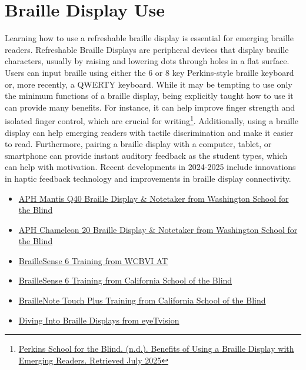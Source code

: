\hypertarget{appx10}{}\section[Braille Display Use]{Braille Display Use}\label{appx10}
Learning how to use a refreshable braille display is essential for emerging braille readers. Refreshable Braille Displays are peripheral devices that display braille characters, usually by raising and lowering dots through holes in a flat surface. Users can input braille using either the 6 or 8 key Perkins-style braille keyboard or, more recently, a QWERTY keyboard. While it may be tempting to use only the minimum functions of a braille display, being explicitly taught how to use it can provide many benefits. For instance, it can help improve finger strength and isolated finger control, which are crucial for writing\footnote{\raggedright \href{https://www.perkins.org/resource/benefits-using-braille-display-emerging-readers/}{Perkins School for the Blind. (n.d.). Benefits of Using a Braille Display with Emerging Readers. Retrieved July 2025}}. Additionally, using a braille display can help emerging readers with tactile discrimination and make it easier to read. Furthermore, pairing a braille display with a computer, tablet, or smartphone can provide instant auditory feedback as the student types, which can help with motivation. Recent developments in 2024-2025 include innovations in haptic feedback technology and improvements in braille display connectivity.
\begin{itemize}
\item \href{https://view.officeapps.live.com/op/view.aspx?src=https\%3A\%2F\%2Fwww.wssb.wa.gov\%2Fsites\%2Fdefault\%2Ffiles\%2F2021-10\%2FUsing\%2520APH\%2520Mantis\%2520Q40.docx&wdOrigin=BROWSELINK}{APH Mantis Q40 Braille Display \& Notetaker from Washington School for the Blind}
\item \href{https://view.officeapps.live.com/op/view.aspx?src=https\%3A\%2F\%2Fwww.wssb.wa.gov\%2Fsites\%2Fdefault\%2Ffiles\%2F2023-07\%2FUsing\%2520APH\%2520Chameleon\%252020.docx&wdOrigin=BROWSELINK}{APH Chameleon 20 Braille Display \& Notetaker from Washington School for the Blind}
\item \href{https://drive.google.com/drive/folders/1V\_hXjrsDeKUbNImA6Q77joADQbqMKKKl}{BrailleSense 6 Training from WCBVI AT}
\item \href{https://drive.google.com/drive/folders/10HeixUb4E21nPLCStmnrsxLVehKThPP}{BrailleSense 6 Training from California School of the Blind}
\item \href{https://drive.google.com/drive/folders/1OKBBdjbbD6asrE4dYyP7do9EWvY--5wf}{BrailleNote Touch Plus Training from California School of the Blind}
\item \href{https://eyetvision.org/}{Diving Into Braille Displays from eyeTvision}
\end{itemize}

